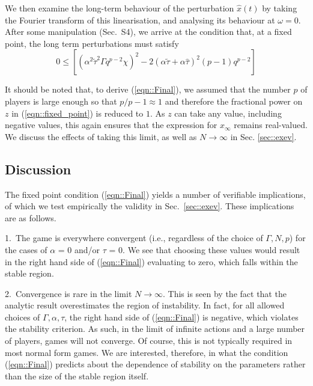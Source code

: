 \documentclass{article}
\newcommand{\ttau}{\tilde{\tau}}
\newcommand{\htau}{\hat{\tau}}
\newcommand{\xfixed}{x_\infty}
\newcommand{\xpert}{\hat{x}(t)}
\begin{document}
We then examine the
long-term behaviour of the perturbation $\xpert$ by taking
the Fourier transform of this linearisation, and analysing its
behaviour at $\omega = 0$. After some manipulation (Sec.~S4), we arrive at the condition that, at a fixed point, the long term perturbations must satisfy
%
\begin{equation}
    \label{eqn::Final}
    0 \leq \left [(\alpha^2 \ttau^2 \Gamma q^{p-2} \chi)^{2} - 2 (\alpha \ttau + \alpha \htau)^2 (p-1)q^{p-2} \right ]
\end{equation}

It should be noted that, to derive (\ref{eqn::Final}), we assumed that the number $p$ of players is large enough so that $p/p-1 \approx 1$ and therefore the fractional power on $z$ in (\ref{eqn::fixed_point}) is reduced to $1$. As $z$ can take any value, including negative values, this again ensures that the expression for $\xfixed$ remains real-valued. We discuss the effects of taking this limit, as well as $N \rightarrow \infty$ in Sec. \ref{sec::exev}.

\subsection{Discussion} \label{sec::discussion}

The fixed point condition (\ref{eqn::Final}) yields a number of verifiable implications, of which we test empirically the validity in Sec.~\ref{sec::exev}. These implications are as follows.
%

1.~The game is everywhere convergent (i.e., regardless of the choice of $\Gamma, N, p$) for the cases of $\alpha$ = 0 and/or $\tau$ = 0.  We see that choosing these values would result in the right hand side of (\ref{eqn::Final}) evaluating to zero, which falls within the stable region.
    

2.~Convergence is rare in the limit $N \rightarrow
 \infty$. This is seen by the fact that the analytic result overestimates the region of instability. In fact, for all allowed choices of $\Gamma, \alpha, \tau$, the right hand side of (\ref{eqn::Final}) is negative, which violates the stability criterion. As such, in the limit of infinite actions and a large number of players, games will not converge. Of course, this is not typically required in most normal form games. We are interested, therefore, in what the condition (\ref{eqn::Final}) predicts about the dependence of stability on the parameters rather than the size of the stable region itself.
   
\end{document}
